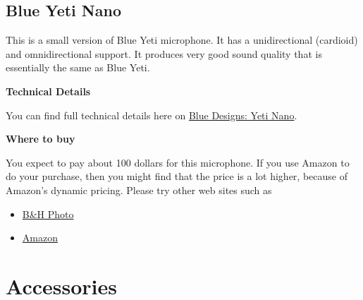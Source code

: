 \subsection{Blue Yeti Nano}

\begin{gram}
%
This is a small version of Blue Yeti microphone.
%
It has a unidirectional (cardioid) and omnidirectional support.
%
It produces very good sound quality that is essentially the same as Blue Yeti.


\textbf{Technical Details}

You can find full technical details here on \href{https://www.bluedesigns.com/products/yeti-nano/}{Blue Designs: Yeti Nano}.


\textbf{Where to buy}

You expect to pay about 100 dollars for this microphone.  If you use Amazon to do your purchase, then you might find that the price is a lot higher, because of Amazon's dynamic pricing.  Please try other web sites such as 

\begin{itemize}
\item
\href{https://www.bhphotovideo.com/c/l-search?q=Blue%20Yeti%20Nano&N=0}{B\&H Photo}
\item 
\href{https://www.amazon.com/Blue-Yeti-Premium-Recording-Streaming/dp/B07DTTGZ7M}{Amazon}
\end{itemize}
\end{gram}

\begin{gram}
\end{gram}


\section{Accessories}

